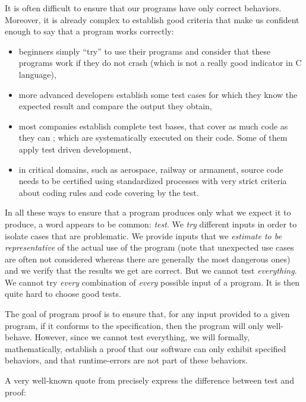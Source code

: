 

It is often difficult to ensure that our programs have only correct
behaviors. Moreover, it is already complex to establish good criteria
that make us confident enough to say that a program works correctly:



\begin{itemize}
\item
  beginners simply ``try'' to use their programs and consider that
  these programs work if they do not crash (which is not a really good
  indicator in C language),
\item
  more advanced developers establish some test cases for which they know
  the expected result and compare the output they obtain,
\item
  most companies establish complete test bases, that cover as much
  code as they can ; which are systematically executed on their code.
  Some of them apply test driven development,
\item
  in critical domains, such as aerospace, railway or armament, source
  code needs to be certified using standardized processes with very
  strict criteria about coding rules and code covering by the test.
\end{itemize}

In all these ways to ensure that a program produces only what we expect
it to produce, a word appears to be common: \emph{test}. We \emph{try}
different inputs in order to isolate cases that are problematic. We
provide inputs that we \emph{estimate to be representative} of the
actual use of the program (note that unexpected use cases are often not
considered whereas there are generally the most dangerous ones) and we
verify that the results we get are correct. But we cannot test
\emph{everything}. We cannot try \emph{every} combination of
\emph{every} possible input of a program. It is then quite hard to
choose good tests.


The goal of program proof is to ensure that, for any input provided to a
given program, if it conforms to the specification, then the program will
only well-behave. However, since we cannot test everything, we will
formally, mathematically, establish a proof that our software can only
exhibit specified behaviors, and that runtime-errors are not part of
these behaviors.



A very well-known quote from 
precisely express the difference between test and proof:



